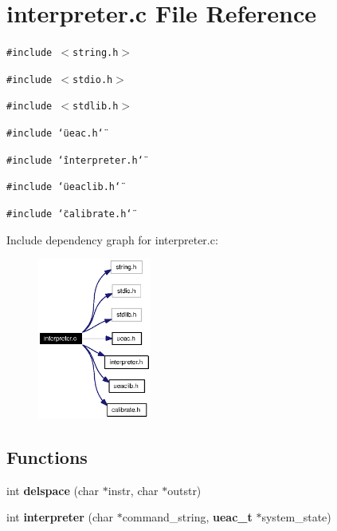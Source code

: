 \section{interpreter.c File Reference}
\label{interpreter_8c}
{\tt \#include $<$string.h$>$}\par
{\tt \#include $<$stdio.h$>$}\par
{\tt \#include $<$stdlib.h$>$}\par
{\tt \#include \char`\"{}ueac.h\char`\"{}}\par
{\tt \#include \char`\"{}interpreter.h\char`\"{}}\par
{\tt \#include \char`\"{}ueaclib.h\char`\"{}}\par
{\tt \#include \char`\"{}calibrate.h\char`\"{}}\par


Include dependency graph for interpreter.c:\begin{figure}[H]
\begin{center}
\leavevmode
\includegraphics[width=106pt]{interpreter_8c__incl}
\end{center}
\end{figure}
\subsection*{Functions}
\begin{CompactItemize}
\item 
int {\bf delspace} (char $\ast$instr, char $\ast$outstr)
\item 
int {\bf interpreter} (char $\ast$command\_\-string, {\bf ueac\_\-t} $\ast$system\_\-state)
\end{CompactItemize}
